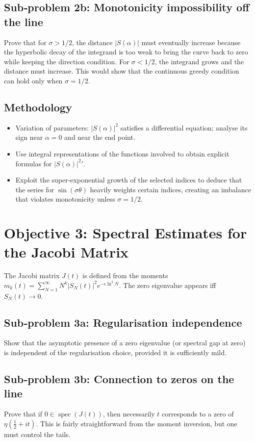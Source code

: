 \documentclass[11pt,a4paper]{article}
\begin{document}
\subsection{Sub‑problem 2b: Monotonicity impossibility off the line}
Prove that for $\sigma>1/2$, the distance $|S(\alpha)|$ must eventually increase because the hyperbolic decay of the integrand is too weak to bring the curve back to zero while keeping the direction condition.  For $\sigma<1/2$, the integrand grows and the distance must increase.  This would show that the continuous greedy condition can hold only when $\sigma=1/2$.

\subsection{Methodology}
\begin{itemize}
    \item Variation of parameters: $|S(\alpha)|^2$ satisfies a differential equation; analyse its sign near $\alpha=0$ and near the end point.
    \item Use integral representations of the functions involved to obtain explicit formulas for $|S(\alpha)|^2'$.
    \item Exploit the super‑exponential growth of the selected indices to deduce that the series for $\sin(\sigma\theta)$ heavily weights certain indices, creating an imbalance that violates monotonicity unless $\sigma=1/2$.
\end{itemize}

\section{Objective 3: Spectral Estimates for the Jacobi Matrix}
\label{sec:jacobi-est}

The Jacobi matrix $J(t)$ is defined from the moments $m_k(t)=\sum_{N=1}^\infty N^k |S_N(t)|^2 e^{-\epsilon\ln^2 N}$.  The zero eigenvalue appears iff $S_N(t)\to0$.

\subsection{Sub‑problem 3a: Regularisation independence}
Show that the asymptotic presence of a zero eigenvalue (or spectral gap at zero) is independent of the regularisation choice, provided it is sufficiently mild.

\subsection{Sub‑problem 3b: Connection to zeros on the line}
Prove that if $0\in\operatorname{spec}(J(t))$, then necessarily $t$ corresponds to a zero of $\eta(\frac12+it)$.  This is fairly straightforward from the moment inversion, but one must control the tails.
\end{document}
